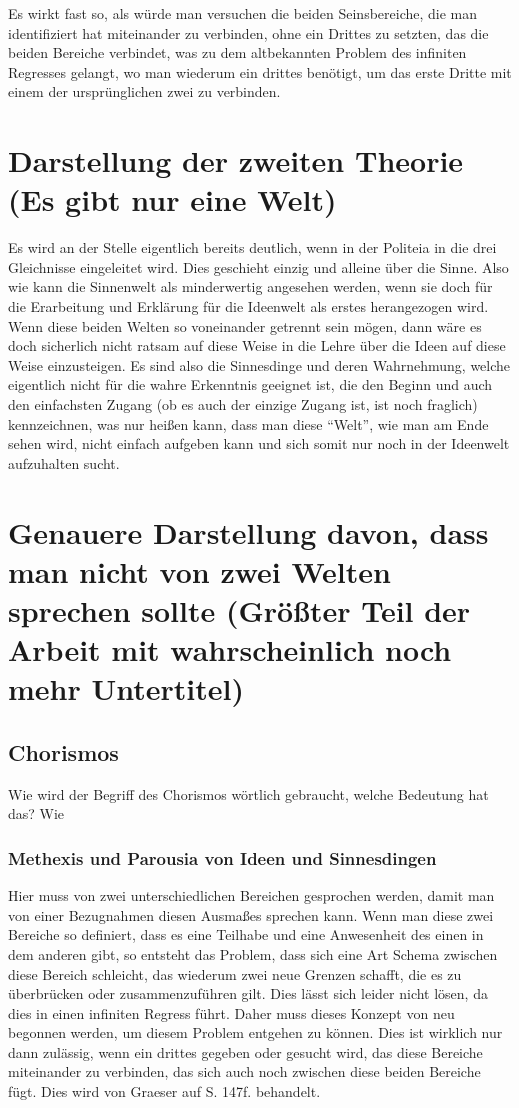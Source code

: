 \documentclass[12pt]{article}
\begin{document}
Es  wirkt fast so, als würde man versuchen die beiden Seinsbereiche, die man identifiziert hat miteinander zu verbinden, ohne ein Drittes zu setzten, das die beiden Bereiche verbindet, was zu dem altbekannten Problem des infiniten Regresses gelangt, wo man wiederum ein drittes benötigt, um das erste Dritte mit einem der ursprünglichen zwei zu verbinden.

\section{Darstellung der zweiten Theorie (Es gibt nur eine Welt)}
Es wird an der Stelle eigentlich bereits deutlich, wenn in der Politeia in die drei Gleichnisse eingeleitet wird. Dies geschieht einzig und alleine über die Sinne. Also wie kann die Sinnenwelt als minderwertig angesehen werden, wenn sie doch für die Erarbeitung und Erklärung für die Ideenwelt als erstes herangezogen wird.
Wenn diese beiden Welten so voneinander getrennt sein mögen, dann wäre es doch sicherlich nicht ratsam auf diese Weise in die Lehre über die Ideen auf diese Weise einzusteigen. Es sind also die Sinnesdinge und deren Wahrnehmung, welche eigentlich nicht für die wahre Erkenntnis geeignet ist, die den Beginn und auch den einfachsten Zugang (ob es auch der einzige Zugang ist, ist noch fraglich) kennzeichnen, was nur heißen kann, dass man diese \enquote{Welt}, wie man am Ende sehen wird, nicht einfach aufgeben kann und sich somit nur noch in der Ideenwelt aufzuhalten sucht.
\section{Genauere Darstellung davon, dass man nicht von zwei Welten sprechen sollte (Größter Teil der Arbeit mit wahrscheinlich noch mehr Untertitel)}
\subsection{Chorismos}
Wie wird der Begriff des Chorismos wörtlich gebraucht, welche Bedeutung hat das? Wie 


\subsubsection{Methexis und Parousia von Ideen und Sinnesdingen}
Hier muss von zwei unterschiedlichen Bereichen gesprochen werden, damit man von einer Bezugnahmen diesen Ausmaßes sprechen kann.
Wenn man diese zwei Bereiche so definiert, dass es eine Teilhabe und eine Anwesenheit des einen in dem anderen gibt, so entsteht das Problem, dass sich eine Art Schema zwischen diese Bereich schleicht, das wiederum zwei neue Grenzen schafft, die es zu überbrücken oder zusammenzuführen gilt. Dies lässt sich leider nicht lösen, da dies in einen infiniten Regress führt. Daher muss dieses Konzept von neu begonnen werden, um diesem Problem entgehen zu können. Dies ist wirklich nur dann zulässig, wenn ein drittes gegeben oder gesucht wird, das diese Bereiche miteinander zu verbinden, das sich auch noch zwischen diese beiden Bereiche fügt.
Dies wird von Graeser auf S. 147f. behandelt.  
\end{document}
